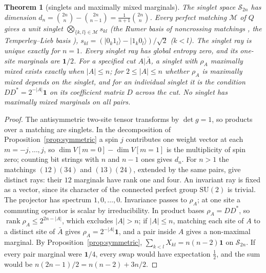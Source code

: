 \documentclass[aps,pra,onecolumn,superscriptaddress,nofootinbib,10pt]{revtex4-2}
\newtheorem{theorem}{Theorem}
\theoremstyle{definition}
\theoremstyle{remark}
\newcommand{\rk}{\operatorname{rank}}
\newcommand{\SU}{\mathrm{SU}}
\begin{document}
\begin{theorem}[singlets and maximally mixed marginals]\label{thm:cusinglet}
The singlet space $\mathcal S_{2n}$ has dimension $d_n=\binom{2n}{n}-\binom{2n}{n-1}=\frac1{n+1}\binom{2n}{n}$.  Every perfect
matching $\mathcal M$ of $Q$ gives a unit singlet $\bigotimes_{\{k,l\}\in\mathcal M}s_{kl}$ (the Rumer basis of noncrossing matchings
\cite{rf:Rumer1932}, the Temperley--Lieb basis \cite{rf:Temperley1971}), $s_{kl}=(\lvert0_k1_l\rangle-\lvert1_k0_l\rangle)/\sqrt2$ ($k<l$).  The
singlet ray is unique exactly for $n=1$.  Every singlet ray has global entropy zero, and its one-site
marginals are $\mathbf1/2$.  For a specified cut $A\vert\bar A$, a singlet with $\rho_A$ maximally mixed exists exactly when
$\lvert A\rvert\le n$; for $2\le\lvert A\rvert\le n$ whether $\rho_A$ is maximally mixed depends on the singlet, and for an individual
singlet it is the condition $DD^*=2^{-\lvert A\rvert}\mathbf1$ on its coefficient matrix $D$ across the cut.  No singlet has maximally
mixed marginals on all pairs.
\end{theorem}
\begin{proof}
The antisymmetric two-site tensor transforms by $\det g=1$, so products over a matching are singlets.  In
the decomposition of Proposition~\ref{prop:symmetric} a spin $j$ contributes one weight vector at each $m=-j,\dots,j$, so
$\dim V[m{=}0]-\dim V[m{=}1]$ is the multiplicity of spin zero; counting bit strings with $n$ and $n-1$ ones gives
$d_n$.  For $n>1$ the matchings $(12)(34)$ and $(13)(24)$, extended by the same pairs, give distinct rays: their
$12$ marginals have rank one and four.  An invariant ray is fixed as a vector, since its character of the
connected perfect group $\SU(2)$ is trivial.  The projector has spectrum $1,0,\dots,0$.  Invariance passes to
$\rho_A$; at one site a commuting operator is scalar by irreducibility.  In product bases $\rho_A=DD^*$, so
$\rk\rho_A\le2^{2n-\lvert A\rvert}$, which excludes $\lvert A\rvert>n$; if $\lvert A\rvert\le n$, matching each site of $A$ to a distinct site of $\bar A$
gives $\rho_A=2^{-\lvert A\rvert}\mathbf1$, and a pair inside $A$ gives a non-maximal marginal.  By Proposition~\ref{prop:symmetric},
$\sum_{k<l}X_{kl}=n(n-2)\mathbf1$ on $\mathcal S_{2n}$.  If every pair marginal were $\mathbf1/4$, every swap would have expectation $\tfrac12$,
and the sum would be $n(2n-1)/2=n(n-2)+3n/2$.
\end{proof}
\end{document}
